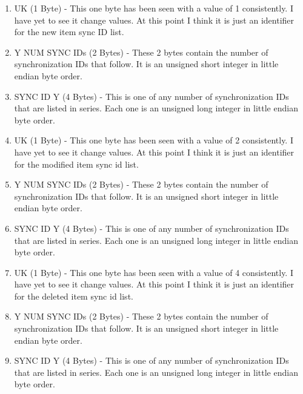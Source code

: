             \begin{enumerate}
              \item UK (1 Byte) - This one byte has been seen with a value of
              1 consistently. I have yet to see it change values. At this
              point I think it is just an identifier for the new item sync ID
              list.

              \item Y NUM SYNC IDs (2 Bytes) - These 2 bytes contain the
              number of synchronization IDs that follow. It is an unsigned
              short integer in little endian byte order.

              \item SYNC ID Y (4 Bytes) - This is one of any number of
              synchronization IDs that are listed in series. Each one is an
              unsigned long integer in little endian byte order.

              \item UK (1 Byte) - This one byte has been seen with a value of
              2 consistently. I have yet to see it change values. At this
              point I think it is just an identifier for the modified item
              sync id list.

              \item Y NUM SYNC IDs (2 Bytes) - These 2 bytes contain the
              number of synchronization IDs that follow. It is an unsigned
              short integer in little endian byte order.

              \item SYNC ID Y (4 Bytes) - This is one of any number of
              synchronization IDs that are listed in series. Each one is an
              unsigned long integer in little endian byte order.

              \item UK (1 Byte) - This one byte has been seen with a value of
              4 consistently. I have yet to see it change values. At this
              point I think it is just an identifier for the deleted item sync
              id list.

              \item Y NUM SYNC IDs (2 Bytes) - These 2 bytes contain the
              number of synchronization IDs that follow. It is an unsigned
              short integer in little endian byte order.

              \item SYNC ID Y (4 Bytes) - This is one of any number of
              synchronization IDs that are listed in series. Each one is an
              unsigned long integer in little endian byte order.
            \end{enumerate}

